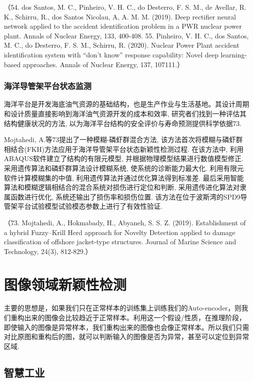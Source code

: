 \documentclass{Style/aas}
\begin{document}
\begin{multicols}{2}
（54.	dos Santos, M. C., Pinheiro, V. H. C., do Desterro, F. S. M., de Avellar, R. K., Schirru, R., dos Santos Nicolau, A, A. M. M. (2019). Deep rectifier neural network applied to the accident identification problem in a PWR nuclear power plant. Annals of Nuclear Energy, 133, 400-408.
55.	Pinheiro, V. H. C., dos Santos, M. C., do Desterro, F. S. M., Schirru, R. (2020). Nuclear Power Plant accident identification system with “don’t know” response capability: Novel deep learning-based approaches. Annals of Nuclear Energy, 137, 107111.）

  
  \subsubsection{海洋导管架平台状态监测}
  海洋平台是开发海底油气资源的基础结构，也是生产作业与生活基地。其设计周期和设计质量直接影响到海洋油气资源开发的成本和效率, 研究者们找到一种评估其结构健康状况的方法, 以为海洋平台结构的安全评价与寿命预测提供科学依据73.

  Mojtahedi, A.等73提出了一种模糊-磷虾群混合方法, 该方法首次将模糊与磷虾群相结合(FKH)方法应用于海洋导管架平台状态新颖性检测过程. 在该方法中, 利用ABAQUS软件建立了结构的有限元模型, 并根据物理模型结果进行数值模型修正.采用遗传算法和磷虾群算法设计模糊系统, 使系统的诊断能力最大化. 利用有限元软件计算模糊集的中值, 利用遗传算法并通过优化算法得到标准差. 最后采用智能算法和模糊逻辑相结合的混合系统对损伤进行定位和判断, 采用遗传进化算法对隶属函数进行优化, 系统还输出了损伤率和损伤位置. 该方法在位于波斯湾的SPD9导管架平台试验模型试验模态参数上进行了有效性验证.

  （73.	Mojtahedi, A., Hokmabady, H., Abyaneh, S. S. Z. (2019). Establishment of a hybrid Fuzzy–Krill Herd approach for Novelty Detection applied to damage classification of offshore jacket-type structures. Journal of Marine Science and Technology, 24(3), 812-829.）
  
  \section{图像领域新颖性检测}
  主要的思想是，如果我们只在正常样本的训练集上训练我们的Auto-encoder，则我们重构出来的图像会比较趋近于正常样本。利用这一个假设/性质，在推理阶段，即使输入的图像是异常样本，我们重构出来的图像也会像正常样本。所以我们只需对比原图和重构后的图，就可以判断输入的图像是否为异常，甚至可以定位到异常区域.

  \subsection{智慧工业}

\end{multicols}
\end{document}
